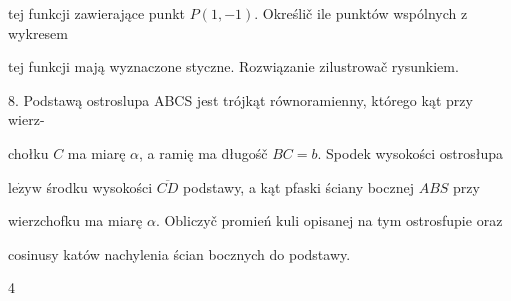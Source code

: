 \documentclass[a4paper,12pt]{article}
\begin{document}
tej funkcji zawierające punkt $P(1,-1)$. Określič ile punktów wspólnych $\mathrm{z}$ wykresem

tej funkcji mają wyznaczone styczne. Rozwiązanie zilustrowač rysunkiem.

8. Podstawą ostroslupa ABCS jest trójkąt równoramienny, którego kąt przy wierz-

chołku $C$ ma miarę $\alpha$, a ramię ma długośč $BC=b$. Spodek wysokości ostrosłupa

$\mathrm{l}\mathrm{e}\dot{\mathrm{z}}\mathrm{y}\mathrm{w}$ środku wysokości $\overline{CD}$ podstawy, a kąt pfaski ściany bocznej $ABS$ przy

wierzchofku ma miarę $\alpha$. Obliczyč promień kuli opisanej na tym ostrosfupie oraz

cosinusy katów nachylenia ścian bocznych do podstawy.

4
\end{document}
